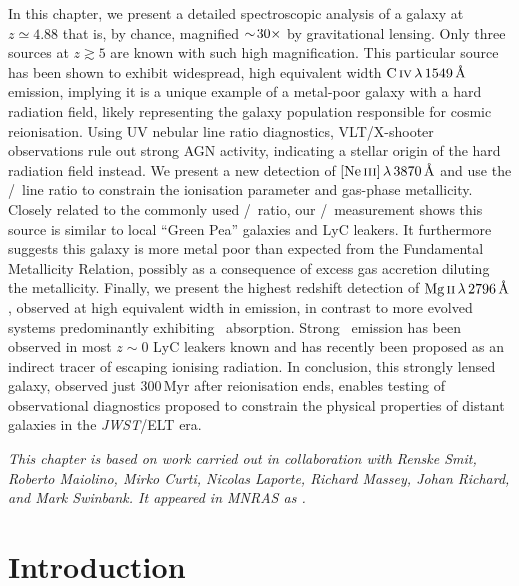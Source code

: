 \noindent In this chapter, we present a detailed spectroscopic analysis of a galaxy at $z \simeq 4.88$ that is, by chance, magnified $\sim \! 30\times$ by gravitational lensing. Only three sources at $z \gtrsim 5$ are known with such high magnification. This particular source has been shown to exhibit widespread, high equivalent width $\CIV \, \lambda \, 1549 \, \Angstrom$ emission, implying it is a unique example of a metal-poor galaxy with a hard radiation field, likely representing the galaxy population responsible for cosmic reionisation. Using UV nebular line ratio diagnostics, VLT/X-shooter observations rule out strong AGN activity, indicating a stellar origin of the hard radiation field instead. We present a new detection of $\NeIII \, \lambda \, 3870 \, \Angstrom$ and use the \NeIII/\OII\ line ratio to constrain the ionisation parameter and gas-phase metallicity. Closely related to the commonly used \OIIIf/\OII\ ratio, our \NeIII/\OII\ measurement shows this source is similar to local ``Green Pea'' galaxies and LyC leakers. It furthermore suggests this galaxy is more metal poor than expected from the Fundamental Metallicity Relation, possibly as a consequence of excess gas accretion diluting the metallicity. Finally, we present the highest redshift detection of $\MgII \, \lambda \, 2796 \, \Angstrom$, observed at high equivalent width in emission, in contrast to more evolved systems predominantly exhibiting \MgII\ absorption. Strong \MgII\ emission has been observed in most $z \sim 0$ LyC leakers known and has recently been proposed as an indirect tracer of escaping ionising radiation. In conclusion, this strongly lensed galaxy, observed just $300 \, \mathrm{Myr}$ after reionisation ends, enables testing of observational diagnostics proposed to constrain the physical properties of distant galaxies in the \textit{JWST}/ELT era.

\vspace{3ex}
\begin{mdframed}[backgroundcolor=black!2.5]
    \textsl{This chapter is based on work carried out in collaboration with Renske Smit, Roberto Maiolino, Mirko Curti, Nicolas Laporte, Richard Massey, Johan Richard, and Mark Swinbank. It appeared in MNRAS as \citet*{2021MNRAS.508.1686W}.}
\end{mdframed}
\vspace*{\fill}

\newpage

\section{Introduction}
\label{chAsec:Introduction}

